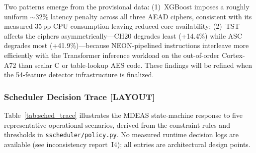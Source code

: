 Two patterns emerge from the provisional data: (1)~XGBoost imposes a
roughly uniform $\sim$32\% latency penalty across all three AEAD
ciphers, consistent with its measured 35\,pp CPU consumption leaving
reduced core availability; (2)~TST affects the ciphers
asymmetrically—CH20 degrades least (+14.4\%) while ASC degrades most
(+41.9\%)—because NEON-pipelined instructions interleave more
efficiently with the Transformer inference workload on the
out-of-order Cortex-A72 than scalar C or table-lookup AES code.
These findings will be refined when the 54-feature detector
infrastructure is finalized.

\subsubsection{Scheduler Decision Trace \textnormal{[LAYOUT]}}
\label{sec:sched_trace}

Table~\ref{tab:sched_trace} illustrates the MDEAS state-machine
response to five representative operational scenarios, derived from the
constraint rules and thresholds in \texttt{sscheduler/policy.py}.
No measured runtime decision logs are available (see
inconsistency report~I4); all entries are architectural design points.

